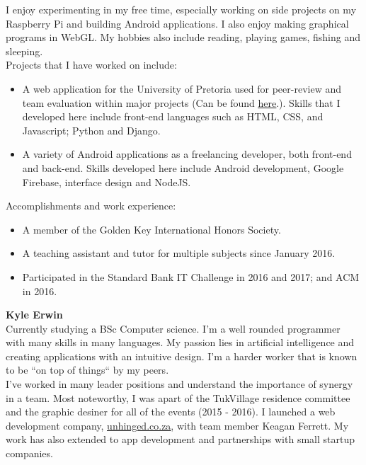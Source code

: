     I enjoy experimenting in my free time, especially working on side projects on my Raspberry Pi and building Android applications. I also enjoy making graphical programs in WebGL. My hobbies also include reading, playing games, fishing and sleeping. \\
    
    \noindent
    Projects that I have worked on include:
    \begin{itemize}
        \item A web application for the University of Pretoria used for peer-review and team evaluation within major projects (Can be found \href{https://github.com/teampinocchio/pinocchio/wiki}{\underline{here}}.). Skills that I developed here include front-end languages such as HTML, CSS, and Javascript; Python and Django.
    
        \item A variety of Android applications as a freelancing developer, both front-end and back-end. Skills developed here include Android development, Google Firebase, interface design and NodeJS.
    \end{itemize}
    
    \noindent
	Accomplishments and work experience:
    \begin{itemize}
        \item A member of the Golden Key International Honors Society.
        \item A teaching assistant and tutor for multiple subjects since January 2016.
        \item Participated in the Standard Bank IT Challenge in 2016 and 2017; and ACM in 2016.
    \end{itemize}

\textbf{Kyle Erwin}\\
	Currently studying a BSc Computer science. I'm a well rounded programmer with many skills in many languages. My passion lies in artificial intelligence and creating applications with an intuitive design. I'm a harder worker that is known to be ``on top of things`` by my peers. \\ 

	I've worked in many leader positions and understand the importance of synergy in a team. Most noteworthy, I was apart of the TukVillage residence committee and the graphic desiner for all of the events (2015 - 2016). I launched a web development company, \href{www.unhinged.co.za}{\underline{unhinged.co.za}}, with team member Keagan Ferrett. My work has also extended to app development and partnerships with small startup companies.\\

